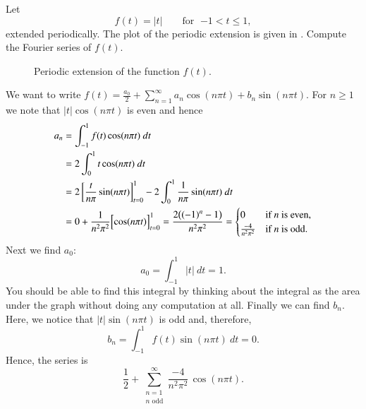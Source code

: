 \begin{example}
Let
\begin{equation*}
f(t) =
\lvert t \rvert
\qquad \text{for } \; {-1} < t \leq 1,
\end{equation*}
extended periodically.  The plot of the
periodic extension is given in .
Compute the Fourier series of $f(t)$.

\begin{figure}[h!t]
\capstart
\begin{center}
\caption{Periodic extension of the function $f(t)$.\label{gfs:sawcontfig}}
\end{center}
\end{figure}

We want to
write $f(t) = \frac{a_0}{2} + \sum_{n=1}^\infty a_n \cos (n \pi t) + b_n
\sin (n \pi t)$.  For $n \geq 1$ we note that $\lvert t \rvert \cos (n \pi t)$
is even and hence
\begin{equation*}
\begin{split}
a_n & = \int_{-1}^1 f(t) \cos (n \pi t) ~ dt \\
& = 2 \int_{0}^1 t \cos (n \pi t) ~ dt \\
 & = 2 \left[ \frac{t}{n \pi} \sin (n \pi t) \right]_{t=0}^1 -
2 \int_{0}^1 \frac{1}{n \pi} \sin (n \pi t) ~ dt \\
& =  0 + \frac{1}{n^2 \pi^2} \Bigl[ \cos (n \pi t) \Bigr]_{t=0}^1
 =  \frac{2 \bigl( {(-1)}^n -1 \bigr) }{n^2 \pi^2}
=
\begin{cases}
0 & \text{if } n \text{ is even} , \\
\frac{-4 }{n^2 \pi^2} & \text{if } n \text{ is odd}  .
\end{cases}
\end{split}
\end{equation*}
Next we find $a_0$:
\begin{equation*}
a_0 = \int_{-1}^1 \lvert t \rvert ~ dt 
=
1 .
\end{equation*}
You should be able to find this integral by thinking about the integral
as the area under the graph without doing any computation at all.
Finally we can find $b_n$.  Here, we notice that
$\lvert t \rvert \sin (n \pi t)$ is odd and, therefore,
\begin{equation*}
b_n = \int_{-1}^1 f(t) \sin (n \pi t) ~ dt = 0 .
\end{equation*}
Hence,
the series is 
\begin{equation*}
\frac{1}{2} + 
\sum_{\substack{n=1 \\ n \text{ odd}}}^\infty \frac{-4}{n^2 \pi^2} \, \cos (n \pi t) .
\end{equation*}


\end{example}
